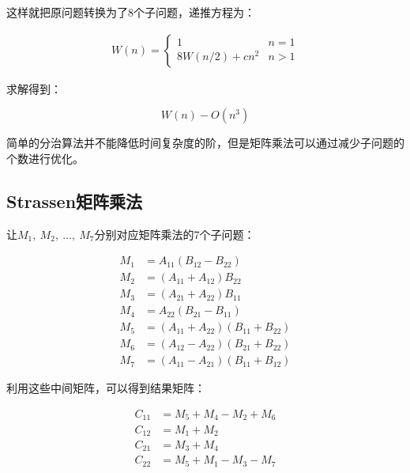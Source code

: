 这样就把原问题转换为了8个子问题，递推方程为：

\vspace{-0.5cm}

\begin{align*}
	W(n) = \begin{cases}
		1              & n = 1 \\
		8W(n/2) + cn^2 & n > 1
	\end{cases}
\end{align*}

求解得到：

\vspace{-0.5cm}

$$
	W(n) - O(n^3)
$$

简单的分治算法并不能降低时间复杂度的阶，但是矩阵乘法可以通过减少子问题的个数进行优化。\\

\subsection{Strassen矩阵乘法}

让$  M_1,\ M_2,\ \dots,\ M_7 $分别对应矩阵乘法的7个子问题：

\vspace{-0.5cm}

\begin{align*}
	M_1 & = A_{11}(B_{12} - B_{22})            \\
	M_2 & = (A_{11} + A_{12})B_{22}            \\
	M_3 & = (A_{21} + A_{22})B_{11}            \\
	M_4 & = A_{22}(B_{21} - B_{11})            \\
	M_5 & = (A_{11} + A_{22})(B_{11} + B_{22}) \\
	M_6 & = (A_{12} - A_{22})(B_{21} + B_{22}) \\
	M_7 & = (A_{11} - A_{21})(B_{11} + B_{12})
\end{align*}

利用这些中间矩阵，可以得到结果矩阵：

\vspace{-1cm}

\begin{align*}
	C_{11} & = M_5 + M_4 - M_2 + M_6 \\
	C_{12} & = M_1 + M_2             \\
	C_{21} & = M_3 + M_4             \\
	C_{22} & = M_5 + M_1 - M_3 - M_7
\end{align*}

